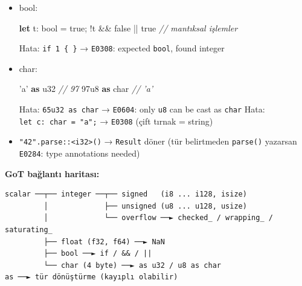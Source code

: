 \documentclass[12pt,a4paper]{article}
\newenvironment{Shaded}{}{}
\newcommand{\CharTok}[1]{\textcolor[rgb]{0.25,0.44,0.63}{#1}}
\newcommand{\CommentTok}[1]{\textcolor[rgb]{0.38,0.63,0.69}{\textit{#1}}}
\newcommand{\ConstantTok}[1]{\textcolor[rgb]{0.53,0.00,0.00}{#1}}
\newcommand{\DataTypeTok}[1]{\textcolor[rgb]{0.56,0.13,0.00}{#1}}
\newcommand{\DecValTok}[1]{\textcolor[rgb]{0.25,0.63,0.44}{#1}}
\newcommand{\FloatTok}[1]{\textcolor[rgb]{0.25,0.63,0.44}{#1}}
\newcommand{\KeywordTok}[1]{\textcolor[rgb]{0.00,0.44,0.13}{\textbf{#1}}}
\newcommand{\NormalTok}[1]{#1}
\newcommand{\OperatorTok}[1]{\textcolor[rgb]{0.40,0.40,0.40}{#1}}
\begin{document}
\begin{itemize}
\begin{Shaded}
\begin{Highlighting}[]
\FloatTok{3.9\_f}\DecValTok{64} \KeywordTok{as} \DataTypeTok{i32}     \CommentTok{// 3 (kesilir)}
\OperatorTok{-}\DecValTok{1\_i}\DecValTok{32} \KeywordTok{as} \DataTypeTok{u32}      \CommentTok{// 4294967295}
\DecValTok{300\_i}\DecValTok{32} \KeywordTok{as} \DataTypeTok{u8}      \CommentTok{// 44}
\end{Highlighting}
\end{Shaded}
\item
  bool:

\begin{Shaded}
\begin{Highlighting}[]
\KeywordTok{let}\NormalTok{ t}\OperatorTok{:} \DataTypeTok{bool} \OperatorTok{=} \ConstantTok{true}\OperatorTok{;}
\OperatorTok{!}\NormalTok{t }\OperatorTok{\&\&} \ConstantTok{false} \OperatorTok{||} \ConstantTok{true}    \CommentTok{// mantıksal işlemler}
\end{Highlighting}
\end{Shaded}


  Hata: \texttt{if\ 1\ \{\ \}} → \texttt{E0308}: expected \texttt{bool}, found integer
\item
  char:

\begin{Shaded}
\begin{Highlighting}[]
\CharTok{'a'} \KeywordTok{as} \DataTypeTok{u32}          \CommentTok{// 97}
\DecValTok{97u}\DecValTok{8} \KeywordTok{as} \DataTypeTok{char}        \CommentTok{// 'a'}
\end{Highlighting}
\end{Shaded}


  Hata: \texttt{65u32\ as\ char} → \texttt{E0604}: only \texttt{u8} can be cast as \texttt{char}
  Hata: \texttt{let\ c:\ char\ =\ "a";} → \texttt{E0308} (çift tırnak = string)
\item
  \texttt{"42".parse::\textless{}i32\textgreater{}()} → \texttt{Result} döner (tür belirtmeden \texttt{parse()} yazarsan \texttt{E0284}: type annotations needed)
\end{itemize}

\textbf{GoT bağlantı haritası:}

\begin{verbatim}
scalar ──┬── integer ──┬── signed   (i8 ... i128, isize)
         │             ├── unsigned (u8 ... u128, usize)
         │             └── overflow ──► checked_ / wrapping_ / saturating_
         ├── float (f32, f64) ──► NaN
         ├── bool ──► if / && / ||
         └── char (4 byte) ──► as u32 / u8 as char
as ──► tür dönüştürme (kayıplı olabilir)
\end{verbatim}
\end{document}
